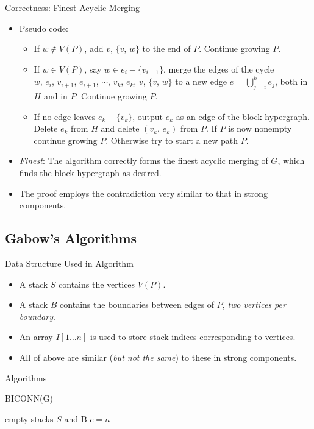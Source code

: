 \documentclass{beamer}
\begin{document}
\begin{frame}{Correctness: Finest Acyclic Merging}
	\begin{itemize}
		\item
		\alert{Pseudo code}:
		\begin{itemize}
			\item
			If $w\notin V(P)$, add $v,\,\{v,\,w\}$ to the end of $P$. Continue growing $P$.
			\item
			If $w\in V(P)$, say $w\in e_i-\{v_{i+1}\}$, merge the edges of the cycle $w,\,e_i,\,v_{i+1},\,e_{i+1},\,\cdots,\,v_k,\,e_k,\,v,\,\{v,\,w\}$
			to a new edge $e=\bigcup_{j=i}^ke_j$, both in $H$ and in $P$. Continue growing $P$.
			\item
			If no edge leaves $e_k-\{v_k\}$, output $e_k$ as an edge of the block hypergraph. Delete $e_k$ from $H$ and delete $(v_k,\,e_k)$
			from $P$. If $P$ is now nonempty continue growing $P$. Otherwise try to start a new path $P$.
		\end{itemize}
		\item
		\emph{Finest}: The algorithm correctly forms the finest acyclic merging of $G$, which finds the block hypergraph as desired.
		\item
		The proof employs the contradiction very similar to that in strong components.
	\end{itemize}
\end{frame}

\subsection{Gabow's Algorithms}

\begin{frame}{Data Structure Used in Algorithm}
	\begin{itemize}
		\item
		A \alert{stack $S$} contains the vertices $V(P)$.
		\item
		A \alert{stack $B$} contains the boundaries between edges of $P$, \emph{two vertices per boundary}.
		\item
		An array \alert{$I[1\ldots n]$} is used to store stack indices corresponding to vertices.
		\item
		All of above are similar (\emph{but not the same}) to these in strong components.
	\end{itemize}
\end{frame}

\begin{frame}{Algorithms}
	\SetAlFnt{\normalsize}
	\begin{procedure}[H]
		\caption{BICONN(G)}
		empty stacks $S$ and B\;
		$c=n$\;
	\end{procedure}
\end{frame}
\end{document}
